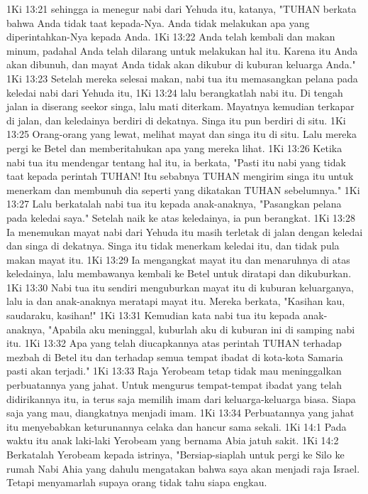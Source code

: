 1Ki 13:21  sehingga ia menegur nabi dari Yehuda itu, katanya, "TUHAN berkata bahwa Anda tidak taat kepada-Nya. Anda tidak melakukan apa yang diperintahkan-Nya kepada Anda.
1Ki 13:22  Anda telah kembali dan makan minum, padahal Anda telah dilarang untuk melakukan hal itu. Karena itu Anda akan dibunuh, dan mayat Anda tidak akan dikubur di kuburan keluarga Anda."
1Ki 13:23  Setelah mereka selesai makan, nabi tua itu memasangkan pelana pada keledai nabi dari Yehuda itu,
1Ki 13:24  lalu berangkatlah nabi itu. Di tengah jalan ia diserang seekor singa, lalu mati diterkam. Mayatnya kemudian terkapar di jalan, dan keledainya berdiri di dekatnya. Singa itu pun berdiri di situ.
1Ki 13:25  Orang-orang yang lewat, melihat mayat dan singa itu di situ. Lalu mereka pergi ke Betel dan memberitahukan apa yang mereka lihat.
1Ki 13:26  Ketika nabi tua itu mendengar tentang hal itu, ia berkata, "Pasti itu nabi yang tidak taat kepada perintah TUHAN! Itu sebabnya TUHAN mengirim singa itu untuk menerkam dan membunuh dia seperti yang dikatakan TUHAN sebelumnya."
1Ki 13:27  Lalu berkatalah nabi tua itu kepada anak-anaknya, "Pasangkan pelana pada keledai saya." Setelah naik ke atas keledainya, ia pun berangkat.
1Ki 13:28  Ia menemukan mayat nabi dari Yehuda itu masih terletak di jalan dengan keledai dan singa di dekatnya. Singa itu tidak menerkam keledai itu, dan tidak pula makan mayat itu.
1Ki 13:29  Ia mengangkat mayat itu dan menaruhnya di atas keledainya, lalu membawanya kembali ke Betel untuk diratapi dan dikuburkan.
1Ki 13:30  Nabi tua itu sendiri menguburkan mayat itu di kuburan keluarganya, lalu ia dan anak-anaknya meratapi mayat itu. Mereka berkata, "Kasihan kau, saudaraku, kasihan!"
1Ki 13:31  Kemudian kata nabi tua itu kepada anak-anaknya, "Apabila aku meninggal, kuburlah aku di kuburan ini di samping nabi itu.
1Ki 13:32  Apa yang telah diucapkannya atas perintah TUHAN terhadap mezbah di Betel itu dan terhadap semua tempat ibadat di kota-kota Samaria pasti akan terjadi."
1Ki 13:33  Raja Yerobeam tetap tidak mau meninggalkan perbuatannya yang jahat. Untuk mengurus tempat-tempat ibadat yang telah didirikannya itu, ia terus saja memilih imam dari keluarga-keluarga biasa. Siapa saja yang mau, diangkatnya menjadi imam.
1Ki 13:34  Perbuatannya yang jahat itu menyebabkan keturunannya celaka dan hancur sama sekali.
1Ki 14:1  Pada waktu itu anak laki-laki Yerobeam yang bernama Abia jatuh sakit.
1Ki 14:2  Berkatalah Yerobeam kepada istrinya, "Bersiap-siaplah untuk pergi ke Silo ke rumah Nabi Ahia yang dahulu mengatakan bahwa saya akan menjadi raja Israel. Tetapi menyamarlah supaya orang tidak tahu siapa engkau.
